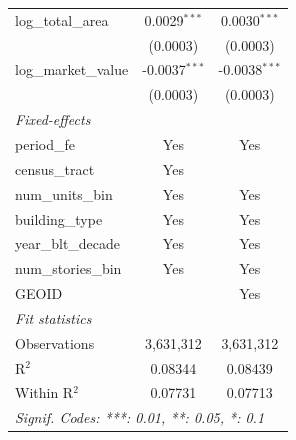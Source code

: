 \begin{tabular}{lcc}
   log\_total\_area                & 0.0029$^{***}$          & 0.0030$^{***}$\\   
                                   & (0.0003)                & (0.0003)\\   
   log\_market\_value              & -0.0037$^{***}$         & -0.0038$^{***}$\\   
                                   & (0.0003)                & (0.0003)\\   
   \midrule
   \emph{Fixed-effects}\\
   period\_fe                      & Yes                     & Yes\\  
   census\_tract                   & Yes                     & \\  
   num\_units\_bin                 & Yes                     & Yes\\  
   building\_type                  & Yes                     & Yes\\  
   year\_blt\_decade               & Yes                     & Yes\\  
   num\_stories\_bin               & Yes                     & Yes\\  
   GEOID                           &                         & Yes\\  
   \midrule
   \emph{Fit statistics}\\
   Observations                    & 3,631,312               & 3,631,312\\  
   R$^2$                           & 0.08344                 & 0.08439\\  
   Within R$^2$                    & 0.07731                 & 0.07713\\  
   \midrule \midrule
   \multicolumn{3}{l}{\emph{Signif. Codes: ***: 0.01, **: 0.05, *: 0.1}}\\
\end{tabular}
\par\endgroup
\begingroup
\centering
